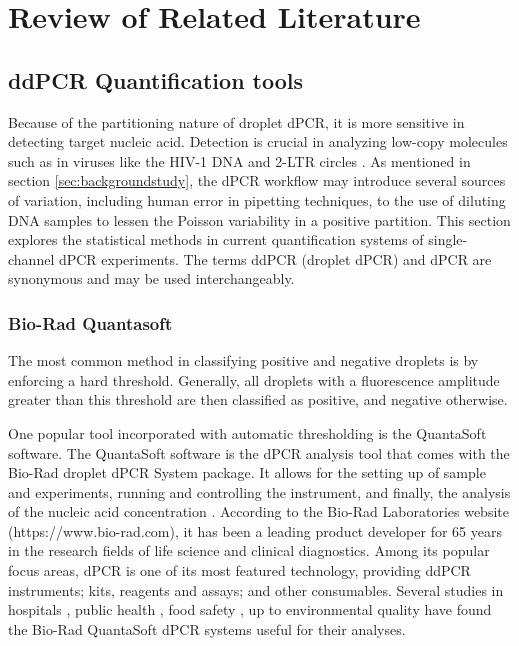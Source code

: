 \chapter{Review of Related Literature}
\label{sec:rrl} 

\section{ddPCR Quantification tools}
\label{sec:dpcrclassifiers}

Because of the partitioning nature of droplet dPCR, it is more sensitive in detecting target nucleic acid. Detection is crucial in analyzing low-copy molecules such as in viruses like the HIV-1 DNA and 2-LTR circles \cite{Henricha2012}. As mentioned in section \ref{sec:backgroundstudy}, the dPCR workflow may introduce several sources of variation, including human error in pipetting techniques, to the use of diluting DNA samples to lessen the Poisson variability in a positive partition. This section explores the statistical methods in current quantification systems of single-channel dPCR experiments. The terms ddPCR (droplet dPCR) and dPCR are synonymous and may be used interchangeably.

\subsection{Bio-Rad Quantasoft}
\label{sec:ddpcrsystem}
The most common method in classifying positive and negative droplets is by enforcing a hard threshold. Generally, all droplets with a fluorescence amplitude greater than this threshold are then classified as positive, and negative otherwise. 

One popular tool incorporated with automatic thresholding is the QuantaSoft software. The QuantaSoft software is the dPCR analysis tool that comes with the Bio-Rad droplet dPCR System package. It allows for the setting up of sample and experiments, running and controlling the instrument, and finally, the analysis of the nucleic acid concentration \cite{Bio-Rad2019}. According to the Bio-Rad Laboratories website (https://www.bio-rad.com), it has been a leading product developer for 65 years in the research fields of life science and clinical diagnostics. Among its popular focus areas, dPCR is one of its most featured technology, providing ddPCR instruments; kits, reagents and assays; and other consumables. Several studies in hospitals \cite{Lopez2016,Chen2018,Abed2017,Tagliapietra2020}, public health \cite{Hussain2017,Nystrand2018}, food safety \cite{Chen2020,Capobianco2020,Basanisi2020}, up to environmental quality \cite{Hamaguchi2018,Jahne2020,Dobnik2016,Mauvisseau2019} have found the Bio-Rad QuantaSoft dPCR systems useful for their analyses. 

